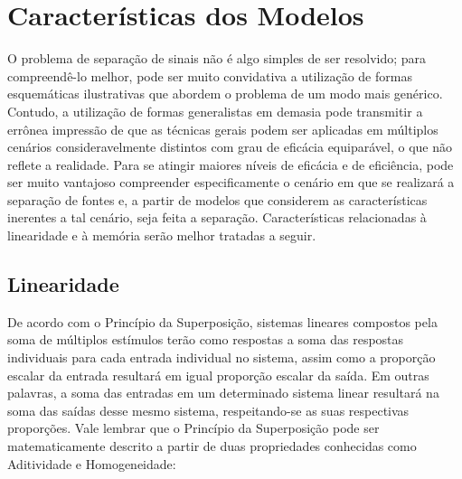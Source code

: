 


\section{Características dos Modelos}
\label{sec:bss_characteristics}

O problema de separação de sinais não é algo simples de ser resolvido; para compreendê-lo melhor, pode ser muito convidativa a utilização de formas esquemáticas ilustrativas que abordem o problema de um modo mais genérico. Contudo, a utilização de formas generalistas em demasia pode transmitir a errônea impressão de que as técnicas gerais podem ser aplicadas em múltiplos cenários consideravelmente distintos com grau de eficácia equiparável, o que não reflete a realidade. Para se atingir maiores níveis de eficácia e de eficiência, pode ser muito vantajoso compreender especificamente o cenário em que se realizará a separação de fontes e, a partir de modelos que considerem as características inerentes a tal cenário, seja feita a separação. Características relacionadas à linearidade e à memória serão melhor tratadas a seguir.


\subsection{Linearidade}
\label{subsec:bss_linearity}

De acordo com o Princípio da Superposição, sistemas lineares compostos pela soma de múltiplos estímulos terão como respostas a soma das respostas individuais para cada entrada individual no sistema, assim como a proporção escalar da entrada resultará em igual proporção escalar da saída. Em outras palavras, a soma das entradas em um determinado sistema linear resultará na soma das saídas desse mesmo sistema, respeitando-se as suas respectivas proporções. Vale lembrar que o Princípio da Superposição pode ser matematicamente descrito a partir de duas propriedades conhecidas como Aditividade e Homogeneidade:\\

